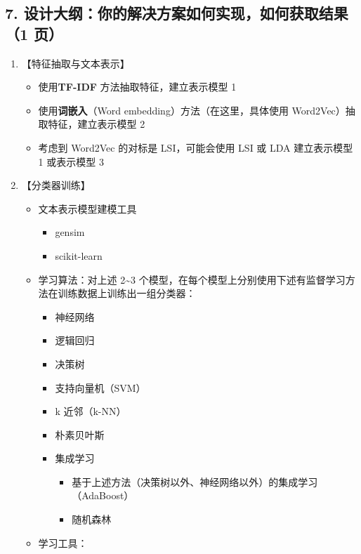 \documentclass[11pt]{article}
\providecommand{\tightlist}{%
      \setlength{\itemsep}{0pt}\setlength{\parskip}{0pt}}
\begin{document}
    \subsection{7. 设计大纲：你的解决方案如何实现，如何获取结果（1
页）}\label{ux8bbeux8ba1ux5927ux7eb2ux4f60ux7684ux89e3ux51b3ux65b9ux6848ux5982ux4f55ux5b9eux73b0ux5982ux4f55ux83b7ux53d6ux7ed3ux679c1-ux9875}

\begin{enumerate}
\def\labelenumi{\arabic{enumi}.}
\tightlist
\item
  【特征抽取与文本表示】

  \begin{itemize}
  \tightlist
  \item
    使用\textbf{TF-IDF} 方法抽取特征，建立表示模型 1
  \item
    使用\textbf{词嵌入}（Word embedding）方法（在这里，具体使用
    Word2Vec）抽取特征，建立表示模型 2
  \item
    考虑到 Word2Vec 的对标是 LSI，可能会使用 LSI 或 LDA 建立表示模型 1
    或表示模型 3
  \end{itemize}
\item
  【分类器训练】

  \begin{itemize}
  \tightlist
  \item
    文本表示模型建模工具

    \begin{itemize}
    \tightlist
    \item
      gensim
    \item
      scikit-learn
    \end{itemize}
  \item
    学习算法：对上述 2\textasciitilde{}3
    个模型，在每个模型上分别使用下述有监督学习方法在训练数据上训练出一组分类器：

    \begin{itemize}
    \tightlist
    \item
      神经网络
    \item
      逻辑回归
    \item
      决策树
    \item
      支持向量机（SVM）
    \item
      k 近邻（k-NN）
    \item
      朴素贝叶斯
    \item
      集成学习

      \begin{itemize}
      \tightlist
      \item
        基于上述方法（决策树以外、神经网络以外）的集成学习（AdaBoost）
      \item
        随机森林
      \end{itemize}
    \end{itemize}
  \item
    学习工具：


\end{itemize}
\end{enumerate}
\end{document}
